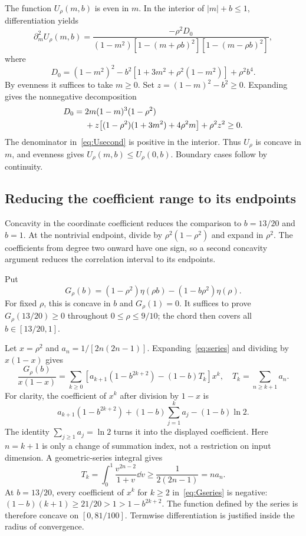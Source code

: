 The function $U_\rho(m,b)$ is even in $m$. In the interior of $|m|+b\le1$, differentiation yields
\begin{equation}\label{eq:Usecond}
\partial_m^2 U_\rho(m,b)
=\frac{-\rho^2 D_0}
{(1-m^2)[1-(m+\rho b)^2][1-(m-\rho b)^2]},
\end{equation}
where
\[
D_0=(1-m^2)^2-b^2[1+3m^2+\rho^2(1-m^2)]+\rho^2b^4.
\]
By evenness it suffices to take $m\ge0$. Set $z=(1-m)^2-b^2\ge0$. Expanding gives the nonnegative decomposition
\begin{align}\label{eq:D0decomp}
D_0={}&2m(1-m)^3(1-\rho^2)\notag\\
&+z\bigl[(1-\rho^2)(1+3m^2)+4\rho^2m\bigr]+\rho^2z^2\ge0.
\end{align}
The denominator in~\eqref{eq:Usecond} is positive in the interior. Thus $U_\rho$ is concave in $m$, and evenness gives $U_\rho(m,b)\le U_\rho(0,b)$. Boundary cases follow by continuity.

\subsection{Reducing the coefficient range to its endpoints}
Concavity in the coordinate coefficient reduces the comparison to $b=13/20$ and $b=1$. At the nontrivial endpoint, divide by $\rho^2(1-\rho^2)$ and expand in $\rho^2$. The coefficients from degree two onward have one sign, so a second concavity argument reduces the correlation interval to its endpoints.

Put
\[
G_\rho(b)=(1-\rho^2)\eta(\rho b)-(1-b\rho^2)\eta(\rho).
\]
For fixed $\rho$, this is concave in $b$ and $G_\rho(1)=0$. It suffices to prove $G_\rho(13/20)\ge0$ throughout $0\le\rho\le9/10$; the chord then covers all $b\in[13/20,1]$.

Let $x=\rho^2$ and $a_n=1/[2n(2n-1)]$. Expanding~\eqref{eq:series} and dividing by $x(1-x)$ gives
\begin{equation}\label{eq:Gseries}
\frac{G_\rho(b)}{x(1-x)}
=\sum_{k\ge0}\left[a_{k+1}(1-b^{2k+2})-(1-b)T_k\right]x^k,
\quad T_k=\sum_{n\ge k+1}a_n.
\end{equation}
For clarity, the coefficient of $x^k$ after division by $1-x$ is
\[
a_{k+1}(1-b^{2k+2})+(1-b)\sum_{j=1}^{k}a_j-(1-b)\ln2.
\]
The identity $\sum_{j\ge1}a_j=\ln2$ turns it into the displayed coefficient. Here $n=k+1$ is only a change of summation index, not a restriction on input dimension. A geometric-series integral gives
\[
T_k=\int_0^1\frac{v^{2n-2}}{1+v}\dd v
\ge\frac1{2(2n-1)}=na_n.
\]
At $b=13/20$, every coefficient of $x^k$ for $k\ge2$ in~\eqref{eq:Gseries} is negative: $(1-b)(k+1)\ge21/20>1>1-b^{2k+2}$. The function defined by the series is therefore concave on $[0,81/100]$. Termwise differentiation is justified inside the radius of convergence.


